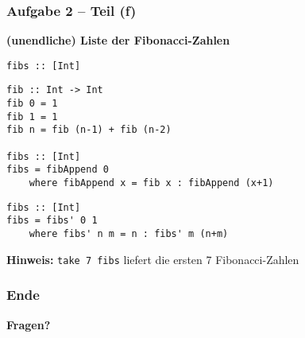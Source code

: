 \documentclass{beamer}
\begin{document}
\begin{frame}[t, fragile] \frametitle{Aufgabe 2 -- Teil (f)}
	\small
	\textbf{(unendliche) Liste der Fibonacci-Zahlen}
	
	\texttt{fibs :: [Int]}
	
	\pause \bigskip
	\begin{lstlisting}[style=bg]
fib :: Int -> Int
fib 0 = 1
fib 1 = 1
fib n = fib (n-1) + fib (n-2)

fibs :: [Int]
fibs = fibAppend 0
	where fibAppend x = fib x : fibAppend (x+1)
	\end{lstlisting}
	\pause
	\begin{lstlisting}[style=bg]
fibs :: [Int]
fibs = fibs' 0 1
	where fibs' n m = n : fibs' m (n+m)
	\end{lstlisting}

	\textbf{Hinweis:} \texttt{take 7 fibs} liefert die ersten 7 Fibonacci-Zahlen
\end{frame}


\begin{frame} \frametitle{Ende}
	\centering
	\textbf{Fragen?}
\end{frame}
\end{document}
